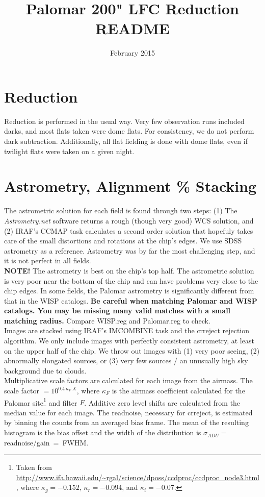 \documentclass{article}
\title{Palomar 200" LFC Reduction README}
\author{February 2015}
\date{}
\begin{document}
\maketitle

\section{Reduction}
Reduction is performed in the usual way. Very few observation runs 
included darks, and most flats taken were dome flats. For consistency, 
we do not perform dark subtraction. Additionally, all flat fielding is done 
with dome flats, even if twilight flats were taken on a given night.

\section{Astrometry, Alignment \% Stacking}
The astrometric solution for each field is found through two steps:
(1) The \textit{Astrometry.net} software returns a rough 
(though very good) WCS solution, and (2) IRAF's CCMAP task calculates
a second order solution that hopefuly takes care of the small distortions
and rotations at the chip's edges. We use SDSS astrometry as a reference.
Astrometry was by far the most challenging
step, and it is not perfect in all fields.\\

\noindent \textbf{NOTE!} The astrometry is best on the chip's top half. 
The astrometric solution is very poor near the bottom of the chip
and can have problems very close to the chip edges. In some fields, 
the Palomar astrometry is significantly different from that in the 
WISP catalogs.
\textbf{Be careful when matching Palomar and WISP catalogs. You may
be missing many valid matches with a small matching radius.} 
Compare WISP.reg and Palomar.reg to check. \\

\noindent Images are stacked using IRAF's IMCOMBINE task and the 
crreject rejection algorithm. 
We only include images 
with perfectly consistent astrometry, at least on the upper half of the chip.
We throw out images with (1) very poor seeing, (2) abnormally elongated 
sources, or (3) very few sources / 
an unusually high sky background due to clouds. \\

\noindent Multiplicative scale factors are calculated for each image
from the airmass. 
The scale factor $=10^{0.4 ~ \kappa_F~ X}$, where $\kappa_F$ is the airmass 
coefficient calculated for the Palomar site\footnote{Taken from 
\url{http://www.ifa.hawaii.edu/~rgal/science/dposs/ccdproc/ccdproc\_node3.html},
where $\kappa_g = -0.152$, $\kappa_r=-0.094$, and $\kappa_i=-0.07$.} 
and filter $F$.
Additive zero level shifts are calculated from the median value for 
each image. 
The readnoise, necessary for crreject,
is estimated by binning the counts from an averaged bias frame. The
mean of the resulting histogram is the bias offset and 
the width of the distribution is $\sigma_{ADU} =~$readnoise/gain$~=~$FWHM.\\
\end{document}
